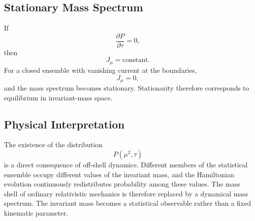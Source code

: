 \subsection{Stationary Mass Spectrum}
If
\[\frac{\partial P}{\partial\tau}=0,\]
then
\[J_\mu=\text{constant}.\]
For a closed ensemble with vanishing current at the boundaries,
\[J_\mu=0,\]
and the mass spectrum becomes stationary.
Stationarity therefore corresponds to equilibrium in invariant-mass
space.
\subsection{Physical Interpretation}
The existence of the distribution
\[P(\mu^2,\tau)\]
is a direct consequence of off-shell dynamics.
Different members of the statistical ensemble occupy different values of
the invariant mass, and the Hamiltonian evolution continuously
redistributes probability among these values.
The mass shell of ordinary relativistic mechanics is therefore replaced
by a dynamical mass spectrum.
The invariant mass becomes a statistical observable rather than a fixed
kinematic parameter.
